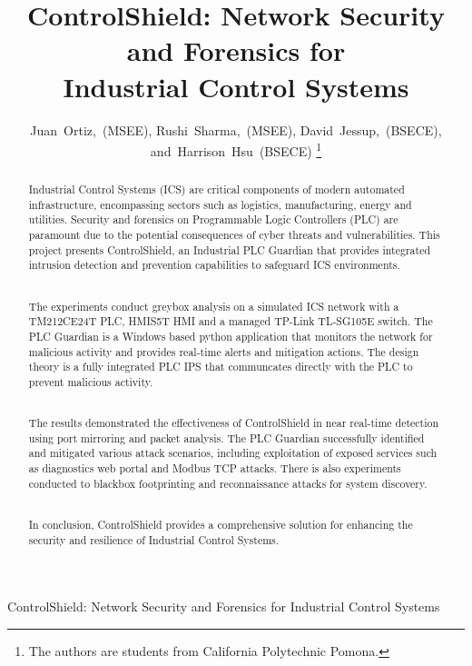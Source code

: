 \documentclass[journal]{IEEEtran}
\begin{document}
\title{ControlShield: Network Security \\and Forensics for \\Industrial Control Systems}

\author{Juan~Ortiz,~(MSEE),
        Rushi~Sharma,~(MSEE),
        David~Jessup,~(BSECE),
        and~Harrison~Hsu~(BSECE)
\thanks{The authors are students from California Polytechnic Pomona.}}




%
{ControlShield: Network Security and Forensics for Industrial Control Systems}

\maketitle

\begin{abstract}
Industrial Control Systems (ICS) are critical components of modern automated
infrastructure, encompassing sectors such as logistics, manufacturing, energy
and utilities. Security and forensics on Programmable Logic Controllers (PLC)
are paramount due to the potential consequences of cyber threats and
vulnerabilities. This project presents ControlShield, an Industrial PLC Guardian
that provides integrated intrusion detection and prevention capabilities to
safeguard ICS environments.

\\ \hspace*{1em}The experiments conduct greybox analysis on a simulated ICS
network with a TM212CE24T PLC, HMIS5T HMI and a managed TP-Link TL-SG105E switch.
The PLC Guardian is a Windows based python application that monitors the network
for malicious activity and provides real-time alerts and mitigation actions. The
design theory is a fully integrated PLC IPS that communcates directly with the
PLC to prevent malicious activity.

\\ \hspace*{1em}The results demonstrated the effectiveness of ControlShield in
near real-time detection using port mirroring and packet analysis. The PLC
Guardian successfully identified and mitigated various attack scenarios, including
exploitation of exposed services such as diagnostics web portal and Modbus TCP attacks.
There is also experiments conducted to blackbox footprinting and reconnaissance
attacks for system discovery.

\\ \hspace*{1em}In conclusion, ControlShield provides a comprehensive solution for
enhancing the security and resilience of Industrial Control Systems.
\end{abstract}
\end{document}
